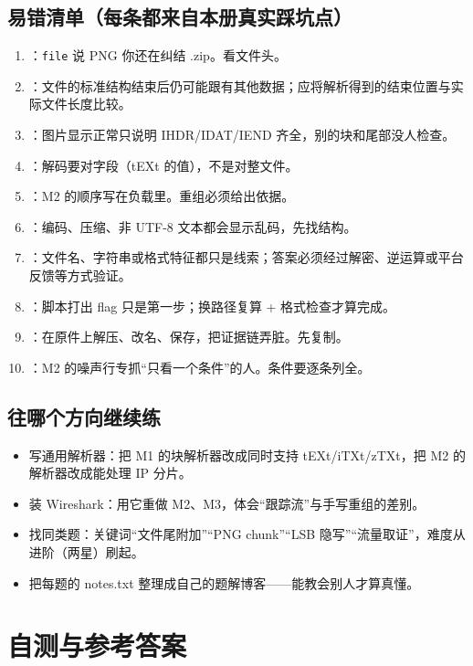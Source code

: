 \documentclass[UTF8,12pt,oneside]{ctexbook}
\begin{document}
\section{易错清单（每条都来自本册真实踩坑点）}
\begin{enumerate}[label=\arabic*.]
\item {}：\verb|file| 说 PNG 你还在纠结 .zip。看文件头。
\item {}：文件的标准结构结束后仍可能跟有其他数据；应将解析得到的结束位置与实际文件长度比较。
\item {}：图片显示正常只说明 IHDR/IDAT/IEND 齐全，别的块和尾部没人检查。
\item {}：解码要对字段（tEXt 的值），不是对整文件。
\item {}：M2 的顺序写在负载里。重组必须给出依据。
\item {}：编码、压缩、非 UTF-8 文本都会显示乱码，先找结构。
\item {}：文件名、字符串或格式特征都只是线索；答案必须经过解密、逆运算或平台反馈等方式验证。
\item {}：脚本打出 flag 只是第一步；换路径复算 + 格式检查才算完成。
\item {}：在原件上解压、改名、保存，把证据链弄脏。先复制。
\item {}：M2 的噪声行专抓“只看一个条件”的人。条件要逐条列全。
\end{enumerate}

\section{往哪个方向继续练}
\begin{itemize}
\item 写通用解析器：把 M1 的块解析器改成同时支持 tEXt/iTXt/zTXt，把 M2 的解析器改成能处理 IP 分片。
\item 装 Wireshark：用它重做 M2、M3，体会“跟踪流”与手写重组的差别。
\item 找同类题：关键词“文件尾附加”“PNG chunk”“LSB 隐写”“流量取证”，难度从进阶（两星）刷起。
\item 把每题的 notes.txt 整理成自己的题解博客——能教会别人才算真懂。
\end{itemize}

\chapter{自测与参考答案}
\label{chap:answers}
\end{document}

